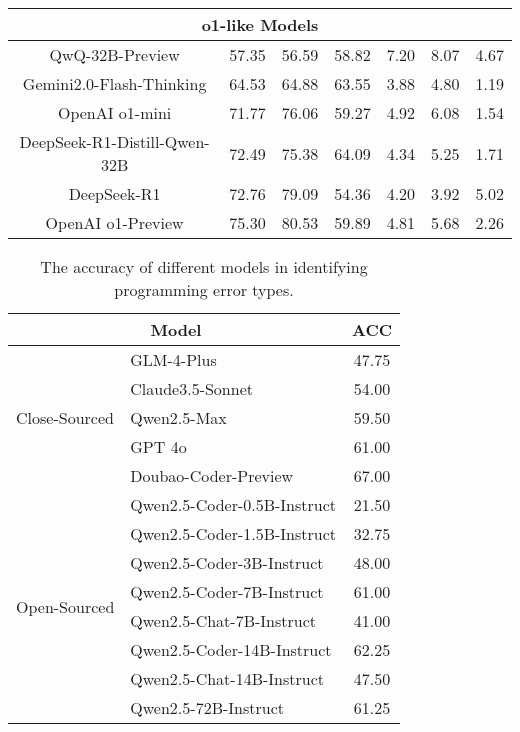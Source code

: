\documentclass[11pt, a4paper, logo, copyright, nonumbering, amsart]{map}
\begin{document}
\begin{CJK*}{UTF8}{gbsn}
\begin{table}[!t]
\begin{adjustbox}{width=0.8\textwidth}
\begin{tabular}{c|cccccc}
    \midrule
    \multicolumn{7}{c}{o1-like Models} \\
    \midrule
    QwQ-32B-Preview & 57.35 & 56.59 & 58.82 & 7.20 & 8.07 & 4.67 \\
    Gemini2.0-Flash-Thinking & 64.53 & 64.88 & 63.55 & 3.88 & 4.80 & 1.19 \\
    OpenAI o1-mini & 71.77 & 76.06 & 59.27 & 4.92 & 6.08 & 1.54 \\
    DeepSeek-R1-Distill-Qwen-32B & 72.49 & 75.38 & 64.09 & 4.34 & 5.25 & 1.71 \\
    DeepSeek-R1 & 72.76 & 79.09 & 54.36 & 4.20 & 3.92 & 5.02 \\
    OpenAI o1-Preview & 75.30 & 80.53 & 59.89 & 4.81 & 5.68 & 2.26 \\
    \bottomrule
    \end{tabular}
    \end{adjustbox}
\end{table}

\begin{wraptable}{r}{3.1in}
    \centering \small
    \vspace{-0.2in}
    \caption{The accuracy of different models in identifying programming error types.} \label{table:bug_acc}
    \begin{adjustbox}{width=0.5\textwidth}
    \begin{tabular}{l|l|c}
        \toprule
        \multicolumn{2}{c}{\textbf{Model}} & \textbf{ACC} \\
        \midrule
        \multirow{5}{*}{Close-Sourced} 
        & GLM-4-Plus & 47.75 \\
        & Claude3.5-Sonnet & 54.00 \\
        & Qwen2.5-Max & 59.50 \\
        & GPT 4o & 61.00 \\
        & Doubao-Coder-Preview & 67.00 \\
        \midrule
        \multirow{8}{*}{Open-Sourced} 
        & Qwen2.5-Coder-0.5B-Instruct & 21.50 \\
        & Qwen2.5-Coder-1.5B-Instruct & 32.75 \\
        & Qwen2.5-Coder-3B-Instruct & 48.00 \\
        & Qwen2.5-Coder-7B-Instruct & 61.00 \\
        & Qwen2.5-Chat-7B-Instruct & 41.00 \\
        & Qwen2.5-Coder-14B-Instruct & 62.25 \\
        & Qwen2.5-Chat-14B-Instruct & 47.50 \\
        & Qwen2.5-72B-Instruct & 61.25 \\
        \bottomrule
    \end{tabular}
    \end{adjustbox}
\end{wraptable}


\end{CJK*}
\end{document}
